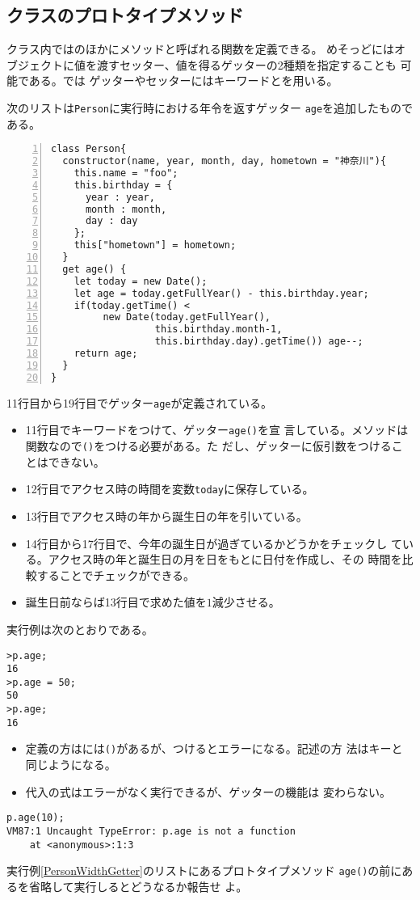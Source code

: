 \subsection{クラスのプロトタイプメソッド}
クラス内ではのほかにメソッドと呼ばれる関数を定義できる。
めそっどにはオブジェクトに値を渡すセッター、値を得るゲッターの2種類を指定することも
可能である。\ES では
ゲッターやセッターにはキーワードとを用いる。
\begin{Exec}\upshape\label{PersonWidthGetter}
次のリストは\texttt{Person}に実行時における年令を返すゲッター
\texttt{age}を追加したものである。
\begin{Verbatim}[numbers=left]
class Person{
  constructor(name, year, month, day, hometown = "神奈川"){
    this.name = "foo";
    this.birthday = {
      year : year,
      month : month,
      day : day
    };
    this["hometown"] = hometown;
  }
  get age() {
    let today = new Date();
    let age = today.getFullYear() - this.birthday.year;
    if(today.getTime() <
         new Date(today.getFullYear(),
                  this.birthday.month-1,
                  this.birthday.day).getTime()) age--;
    return age;
  }
}
\end{Verbatim}
11行目から19行目でゲッター\texttt{age}が定義されている。
 \begin{itemize}
 \item 11行目でキーワードをつけて、ゲッター\texttt{age()}を宣
       言している。メソッドは関数なので\texttt{()}をつける必要がある。た
       だし、ゲッターに仮引数をつけることはできない。
 \item 12行目でアクセス時の時間を変数\texttt{today}に保存している。
 \item 13行目でアクセス時の年から誕生日の年を引いている。
 \item 14行目から17行目で、今年の誕生日が過ぎているかどうかをチェックし
       ている。アクセス時の年と誕生日の月を日をもとに日付を作成し、その
       時間を比較することでチェックができる。
 \item 誕生日前ならば13行目で求めた値を$1$減少させる。
 \end{itemize}
\end{Exec}
 実行例は次のとおりである。
\begin{Verbatim}
>p.age;
16
>p.age = 50;
50
>p.age;
16
\end{Verbatim}
\begin{itemize}
 \item 定義の方はには\texttt{()}があるが、つけるとエラーになる。記述の方
       法はキーと同じようになる。
 \item 代入の式はエラーがなく実行できるが、ゲッターの機能は
       変わらない。
\end{itemize}
\begin{Verbatim}
p.age(10);
VM87:1 Uncaught TypeError: p.age is not a function
    at <anonymous>:1:3
\end{Verbatim}
\begin{Prob}\upshape
実行例\ref{PersonWidthGetter}のリストにあるプロトタイプメソッド
 \texttt{age()}の前にあるを省略して実行しるとどうなるか報告せ
 よ。
\end{Prob}
